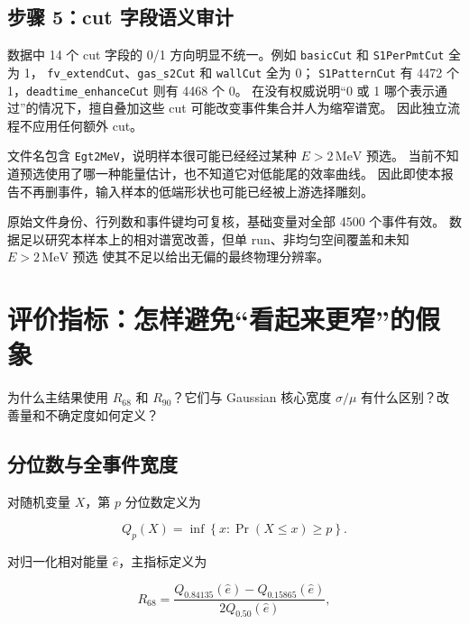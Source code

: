 \documentclass[UTF8,12pt,a4paper,oneside,fontset=none]{ctexart}
\numberwithin{equation}{section}
\newcommand{\Rsixtyeight}{R_{68}}
\newcommand{\Rninety}{R_{90}}
\newcommand{\Erel}{\hat e}
\begin{document}
\subsection{步骤 5：cut 字段语义审计}

数据中 14 个 cut 字段的 0/1 方向明显不统一。例如 \texttt{basicCut} 和 \texttt{S1PerPmtCut} 全为 1，
\texttt{fv\_extendCut}、\texttt{gas\_s2Cut} 和 \texttt{wallCut} 全为 0；
\texttt{S1PatternCut} 有 4472 个 1，\texttt{deadtime\_enhanceCut} 则有 4468 个 0。
在没有权威说明“0 或 1 哪个表示通过”的情况下，擅自叠加这些 cut 可能改变事件集合并人为缩窄谱宽。
因此独立流程不应用任何额外 cut。

\begin{warningbox}
文件名包含 \texttt{Egt2MeV}，说明样本很可能已经经过某种 \(E>2\,\mathrm{MeV}\) 预选。
当前不知道预选使用了哪一种能量估计，也不知道它对低能尾的效率曲线。
因此即使本报告不再删事件，输入样本的低端形状也可能已经被上游选择雕刻。
\end{warningbox}

\begin{conclusionbox}
原始文件身份、行列数和事件键均可复核，基础变量对全部 4500 个事件有效。
数据足以研究本样本上的相对谱宽改善，但单 run、非均匀空间覆盖和未知 \(E>2\,\mathrm{MeV}\) 预选
使其不足以给出无偏的最终物理分辨率。
\end{conclusionbox}

\section{评价指标：怎样避免“看起来更窄”的假象}
\label{sec:metrics}

\begin{questionbox}
为什么主结果使用 \(\Rsixtyeight\) 和 \(\Rninety\)？它们与 Gaussian 核心宽度 \(\sigma/\mu\) 有什么区别？改善量和不确定度如何定义？
\end{questionbox}

\subsection{分位数与全事件宽度}

对随机变量 \(X\)，第 \(p\) 分位数定义为

\begin{equation}
Q_p(X)
=
\inf\left\{x:\Pr(X\le x)\ge p\right\}.
\label{eq:quantile}
\end{equation}

对归一化相对能量 \(\Erel\)，主指标定义为

\begin{equation}
\Rsixtyeight
=
\frac{Q_{0.84135}(\Erel)-Q_{0.15865}(\Erel)}{2Q_{0.50}(\Erel)},
\label{eq:r68}
\end{equation}
\end{document}
